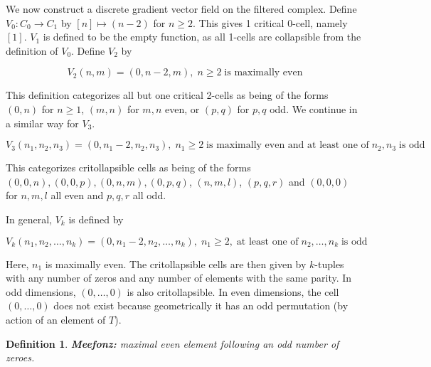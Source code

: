 \documentclass{amsart}
\newtheorem{Definition}[theorem]{Definition}
\newenvironment{definition}{\begin{Definition}\normalfont}{\end{Definition}}
\begin{document}
We now construct a discrete gradient vector field on the filtered complex.
Define $V_{0}: C_{0} \to C_{1}$ by $[n] \mapsto (n-2)$ for $n \geq 2$. This gives 1 critical 0-cell, namely $[1]$. $V_{1}$ is defined to be the empty function, as all 1-cells are collapsible from the definition of $V_{0}$. Define $V_{2}$ by 

$$
V_{2}(n,m) = 
(0,n-2,m), \;  n \geq 2 \; \text{is maximally even}
$$

\bigskip

This definition categorizes all but one critical 2-cells as being of the forms $(0,n)$ for $n \geq 1$, $(m,n)$ for $m,n$ even, or $(p,q)$ for $p,q$ odd. We continue in a similar way for $V_{3}$.

$$
V_{3}(n_{1},n_{2},n_{3}) =
(0,n_{1}-2,n_{2}, n_{3}), \;  n_{1} \geq 2 \; \text{is maximally even
and at least one of} \; n_{2}, n_{3} \; \text{is odd}
$$

\bigskip

This categorizes critollapsible cells as being of the forms $(0,0,n), (0,0,p), (0,n,m), (0,p,q)$, $(n,m,l)$, $(p,q,r)$ and $(0,0,0)$ for $n,m,l$ all even and $p,q,r$ all odd.

In general, $V_{k}$ is defined by 

$$
V_{k}(n_{1},n_{2},\ldots,n_{k}) =
(0,n_{1}-2,n_{2},\ldots, n_{k}), \;  n_{1} \geq 2, \; \text{at least one of} \; n_{2},\ldots, n_{k} \; \text{is odd}
$$

\bigskip

Here, $n_{1}$ is maximally even. The critollapsible cells are then given by $k$-tuples with any number of zeros and any number of elements with the same parity. In odd dimensions, $(0, \ldots, 0)$ is also critollapsible. In even dimensions, the cell $(0, \ldots, 0)$ does not exist because geometrically it has an odd permutation (by action of an element of $T$).

\begin{definition}\label{meefonz}\textbf{Meefonz:} maximal even element following an odd number of zeroes. \end{definition}
\end{document}
